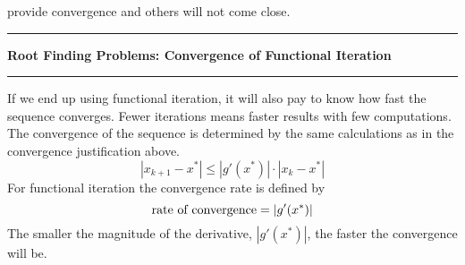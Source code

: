\documentclass[10pt,fleqn]{article}
\begin{document}
provide convergence and others will not come close.
\vskip0.1in\hrule\vskip0.1in
\noindent
{\bf Root Finding Problems: Convergence of Functional Iteration}
\vskip0.1in\hrule\vskip0.1in
\noindent
If we end up using functional iteration, it will also pay to know how fast the
sequence converges. Fewer iterations means faster results with few computations.
The convergence of the sequence is determined by the same calculations as in
the convergence justification above.
$$
  | x_{k+1} - x^* | \leq | g'(x^*) | \cdot| x_k - x^* |
$$
For functional iteration the convergence rate is defined by
$$
  \makebox{rate of convergence} = | g'(x^*) | 
$$
The smaller the magnitude of the derivative, $|g'(x^*)|$, the faster the
convergence will be.
\end{document}
